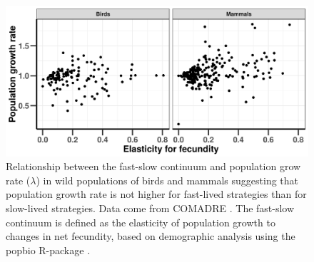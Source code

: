 \begin{figure}
\centering
\includegraphics[width=\textwidth]{./Figures/Appendix3_2/Fig_11.png}
\caption[Fast-slow continuum and $\lambda$]{
Relationship between the fast-slow continuum and population grow rate
($\lambda$) in wild populations of birds and mammals suggesting that population
growth rate is not higher for fast-lived strategies than for slow-lived
strategies. Data come from COMADRE \citep{Salguero-Gomez2016}. The fast-slow
continuum is defined as the elasticity of population growth to changes in net
fecundity, based on demographic analysis using the popbio R-package
\cite{Stubben2007}.}
\label{fig:figApp3.2.11}
\end{figure}

